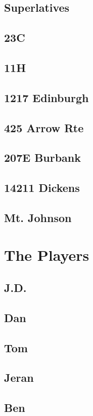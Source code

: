 \documentclass[a4paper,twoside,titlepage]{book}
\begin{document}
      \section{Superlatives}
      \section{23C}
      \section{11H}
      \section{1217 Edinburgh}
      \section{425 Arrow Rte}
      \section{207E Burbank} 
      \section{14211 Dickens}
      \section{Mt. Johnson}
    \chapter{The Players}
      \section{J.D.}
      \section{Dan}
      \section{Tom}
      \section{Jeran}
      \section{Ben}
\end{document}
